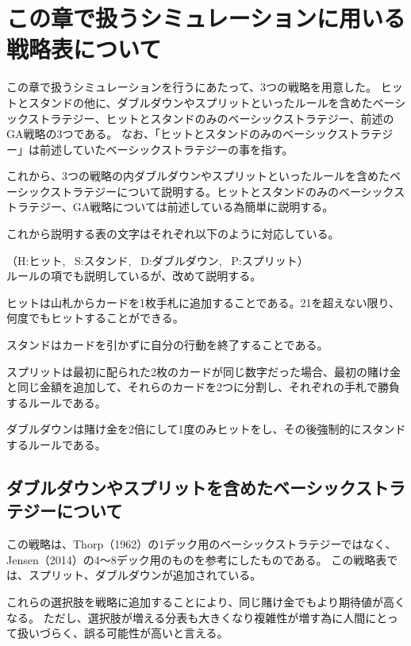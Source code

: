 \section{この章で扱うシミュレーションに用いる戦略表について}
この章で扱うシミュレーションを行うにあたって、3つの戦略を用意した。
ヒットとスタンドの他に、ダブルダウンやスプリットといったルールを含めたベーシックストラテジー、ヒットとスタンドのみのベーシックストラテジー、前述のGA戦略の3つである。
なお、「ヒットとスタンドのみのベーシックストラテジー」は前述していたベーシックストラテジーの事を指す。

これから、3つの戦略の内ダブルダウンやスプリットといったルールを含めたベーシックストラテジーについて説明する。ヒットとスタンドのみのベーシックストラテジー、GA戦略については前述している為簡単に説明する。

これから説明する表の文字はそれぞれ以下のように対応している。

（H:ヒット, \ S:スタンド, \ D:ダブルダウン, \ P:スプリット）  
\\

ルールの項でも説明しているが、改めて説明する。

ヒットは山札からカードを1枚手札に追加することである。21を超えない限り、何度でもヒットすることができる。

スタンドはカードを引かずに自分の行動を終了することである。

スプリットは最初に配られた2枚のカードが同じ数字だった場合、最初の賭け金と同じ金額を追加して、それらのカードを2つに分割し、それぞれの手札で勝負するルールである。

ダブルダウンは賭け金を2倍にして1度のみヒットをし、その後強制的にスタンドするルールである。



\subsection{ダブルダウンやスプリットを含めたベーシックストラテジーについて}

この戦略は、Thorp（1962）の1デック用のベーシックストラテジーではなく、Jensen（2014）の4～8デック用のものを参考にしたものである。
この戦略表では、スプリット、ダブルダウンが追加されている。

これらの選択肢を戦略に追加することにより、同じ賭け金でもより期待値が高くなる。
ただし、選択肢が増える分表も大きくなり複雑性が増す為に人間にとって扱いづらく、誤る可能性が高いと言える。

